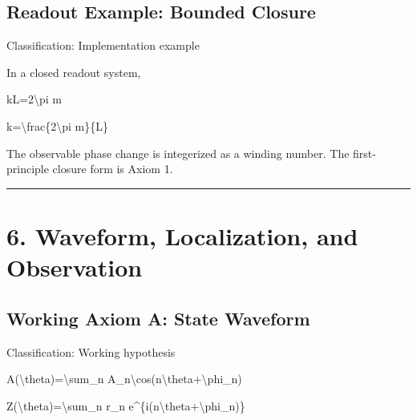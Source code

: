\documentclass[
  a4paper]{article}
\newenvironment{Shaded}{}{}
\newcommand{\NormalTok}[1]{#1}
\begin{document}
\subsection{Readout Example: Bounded
Closure}\label{readout-example-bounded-closure}

Classification: Implementation example

In a closed readout system,

\begin{Shaded}
\begin{Highlighting}[]
\NormalTok{kL=2\textbackslash{}pi m}
\end{Highlighting}
\end{Shaded}

\begin{Shaded}
\begin{Highlighting}[]
\NormalTok{k=\textbackslash{}frac\{2\textbackslash{}pi m\}\{L\}}
\end{Highlighting}
\end{Shaded}

The observable phase change is integerized as a winding number. The
first-principle closure form is Axiom 1.

\begin{center}\rule{0.5\linewidth}{0.5pt}\end{center}

\section{6. Waveform, Localization, and
Observation}\label{waveform-localization-and-observation}

\subsection{Working Axiom A: State
Waveform}\label{working-axiom-a-state-waveform}

Classification: Working hypothesis

\begin{Shaded}
\begin{Highlighting}[]
\NormalTok{A(\textbackslash{}theta)=\textbackslash{}sum\_n A\_n\textbackslash{}cos(n\textbackslash{}theta+\textbackslash{}phi\_n)}
\end{Highlighting}
\end{Shaded}

\begin{Shaded}
\begin{Highlighting}[]
\NormalTok{Z(\textbackslash{}theta)=\textbackslash{}sum\_n r\_n e\^{}\{i(n\textbackslash{}theta+\textbackslash{}phi\_n)\}}
\end{Highlighting}
\end{Shaded}
\end{document}
